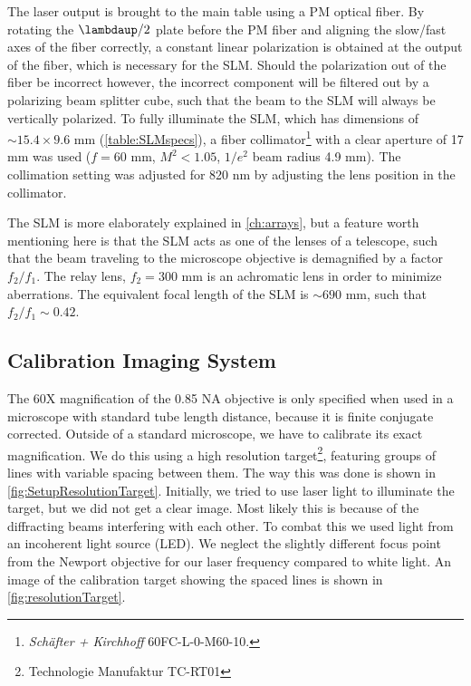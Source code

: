 The laser output is brought to the main table using a \ac{PM} optical fiber.
By rotating the $\lambdaup/2$ plate before the PM fiber and aligning the slow/fast axes of the fiber correctly, a constant linear polarization is obtained at the output of the fiber, which is necessary for the \ac{SLM}.
Should the polarization out of the fiber be incorrect however, the incorrect component will be filtered out by a polarizing beam splitter cube, such that the beam to the SLM will always be vertically polarized.
To fully illuminate the SLM, which has dimensions of $\sim 15.4 \times 9.6$ mm (\cref{table:SLMspecs}), a fiber collimator\footnote{\textit{Schäfter + Kirchhoff} 60FC-L-0-M60-10.} with a clear aperture of 17 mm was used ($f=60$ mm, $M^2 < 1.05$, $1/e^2$ beam radius 4.9 mm).
The collimation setting was adjusted for 820 nm by adjusting the lens position in the collimator.

The SLM is more elaborately explained in \cref{ch:arrays}, but a feature worth mentioning here is that the SLM acts as one of the lenses of a telescope, such that the beam traveling to the microscope objective is demagnified by a factor $f_2/f_1$.
The relay lens, $f_2=300$ mm is an achromatic lens in order to minimize aberrations.
The equivalent focal length of the SLM is $\sim 690$ mm, such that $f_2/f_1 \sim 0.42$.


\subsection{Calibration Imaging System}\label{subsec:CameraCalibration}

The 60X magnification of the 0.85 NA objective is only specified when used in a microscope with standard tube length distance, because it is finite conjugate corrected.
Outside of a standard microscope, we have to calibrate its exact magnification.
We do this using a high resolution target\footnote{Technologie Manufaktur TC-RT01}, featuring groups of lines with variable spacing between them. 
The way this was done is shown in \cref{fig:SetupResolutionTarget}.
Initially, we tried to use laser light to illuminate the target, but we did not get a clear image. 
Most likely this is because of the diffracting beams interfering with each other. 
To combat this we used light from an incoherent light source (\ac{LED}). 
We neglect the slightly different focus point from the Newport objective for our laser frequency compared to white light. 
An image of the calibration target showing the spaced lines is shown in \cref{fig:resolutionTarget}.

